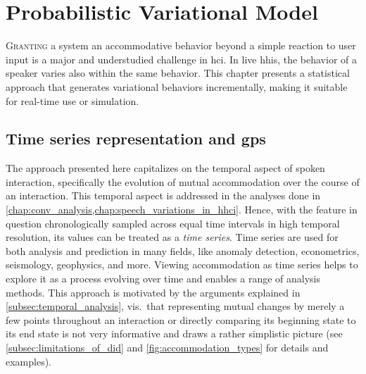 \chapter{Probabilistic Variational Model}
\label{chap:statistical_model}

\lettrine{G}{ranting} a system an accommodative behavior beyond a simple reaction to user input is a major and understudied challenge in \acs{hci}.
In live \acsp{hhi}, the behavior of a speaker varies also within the same behavior.
This chapter presents a statistical approach that generates variational behaviors incrementally, making it suitable for real-time use or simulation.

\pagebreak

\section{Time series representation and \aclp{gp}}
\label{sec:time_series_analysis}

The approach presented here capitalizes on the temporal aspect of spoken interaction, specifically the evolution of mutual accommodation over the course of an interaction.
This temporal aspect is addressed in the analyses done in \cref{chap:conv_analysis,chap:speech_variations_in_hhci}.
Hence, with the feature in question chronologically sampled across equal time intervals in high temporal resolution, its values can be treated as a \emph{time series}.
Time series are used for both analysis and prediction in many fields, like anomaly detection, econometrics, seismology, geophysics, and more.
Viewing accommodation as time series helps to explore it as a process evolving over time and enables a range of analysis methods.
This approach is motivated by the arguments explained in \cref{subsec:temporal_analysis}, vis.\ that representing mutual changes by merely a few points throughout an interaction or directly comparing its beginning state to its end state is not very informative and draws a rather simplistic picture (see \cref{subsec:limitations_of_did} and \cref{fig:accommodation_types} for details and examples).

